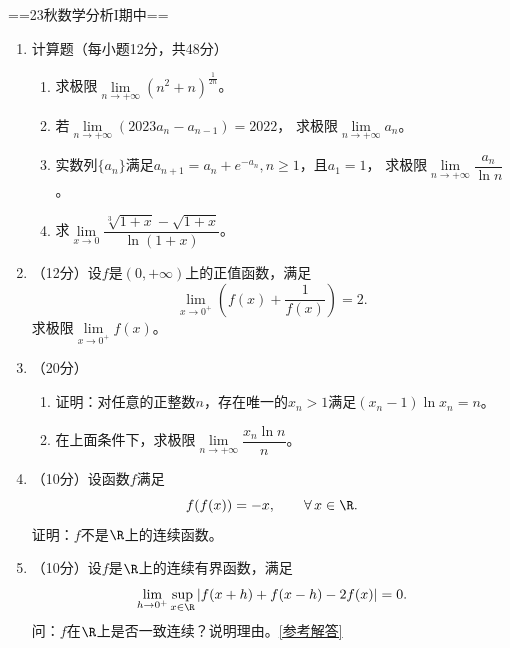 ==23秋数学分析I期中==
\begin{enumerate}
    \item[一] 计算题（每小题12分，共48分）
    \begin{enumerate}[label=(\arabic*)]
    \item 求极限$\lim\limits_{n\to+\infty}(n^2+n)^\frac{1}{2n}$。
    \item 若$\lim\limits_{n\to+\infty}(2023a_n-a_{n-1})=2022$，
    求极限$\lim\limits_{n\to+\infty}a_n$。
    \item 实数列$\{a_n\}$满足$a_{n+1}=a_n+e^{-a_n},n\ge1$，且$a_1=1$，
    求极限$\lim\limits_{n\to+\infty}\dfrac{a_n}{\ln n}$。
    \item 求$\lim\limits_{x\to0}\dfrac{\sqrt[3]{1+x}-\sqrt{1+x}}{\ln(1+x)}$。
    \end{enumerate}
    \item[二] （12分）设$f$是$(0,+\infty)$上的正值函数，满足
    \[\lim_{x\to0^+}\left(f(x)+\frac{1}{f(x)}\right)=2.\]
    求极限$\lim\limits_{x\to0^+}f(x)$。
    \item[三] （20分）\begin{enumerate}[label=(\arabic*)]
    \item 证明：对任意的正整数$n$，存在唯一的$x_n>1$满足$(x_n-1)\ln x_n=n$。
    \item 在上面条件下，求极限$\lim\limits_{n\to+\infty}\dfrac{x_n\ln n}{n}$。
    \end{enumerate}
    \item[四] （10分）设函数$f$满足\[f(f(x))=-x,\qquad\forall\,x\in\R.\]
    证明：$f$不是$\R$上的连续函数。
    \item[五] （10分）设$f$是$\R$上的连续有界函数，满足
    \[\lim_{h\to0^+}\sup\limits_{x\in\R}|f(x+h)+f(x-h)-2f(x)|=0.\]
    问：$f$在$\R$上是否一致连续？说明理由。\href{https://mp.weixin.qq.com/s/KmSXAGo-JMCw9p1BPfrG3Q}{[参考解答]}
\end{enumerate}

